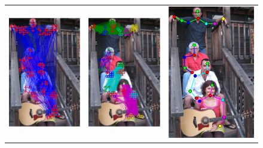 \begin{figure}
\begin{tabular}{c c c }
  \includegraphics[width=0.31\linewidth]{imgidx_0089_init_graph.pdf}&
  \includegraphics[width=0.31\linewidth]{imgidx_0089_graph.pdf}&
  \includegraphics[width=0.31\linewidth]{imgidx_0089_sticks.pdf}
  \\


\end{tabular}
\end{figure}
